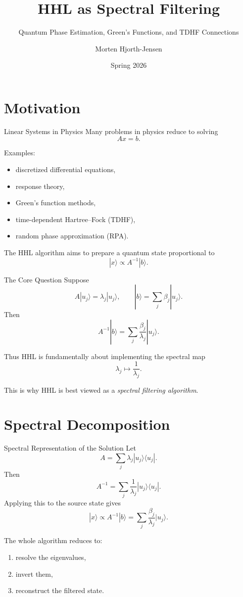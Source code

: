 \documentclass{beamer}
\title{HHL as Spectral Filtering}
\subtitle{Quantum Phase Estimation, Green's Functions, and TDHF Connections}
\author{Morten Hjorth-Jensen}
\date{Spring 2026}
\begin{document}
\frame{\titlepage}

\section{Motivation}

\begin{frame}{Linear Systems in Physics}
Many problems in physics reduce to solving
\[
A x = b.
\]

Examples:
\begin{itemize}
\item discretized differential equations,
\item response theory,
\item Green's function methods,
\item time-dependent Hartree--Fock (TDHF),
\item random phase approximation (RPA).
\end{itemize}

The HHL algorithm aims to prepare a quantum state proportional to
\[
|x\rangle \propto A^{-1}|b\rangle.
\]
\end{frame}


\begin{frame}{The Core Question}
Suppose
\[
A|u_j\rangle = \lambda_j |u_j\rangle,
\qquad
|b\rangle = \sum_j \beta_j |u_j\rangle.
\]
Then
\[
A^{-1}|b\rangle
=
\sum_j \frac{\beta_j}{\lambda_j}|u_j\rangle.
\]

Thus HHL is fundamentally about implementing the spectral map
\[
\lambda_j \mapsto \frac{1}{\lambda_j}.
\]

This is why HHL is best viewed as a \emph{spectral filtering algorithm}.
\end{frame}

\section{Spectral Decomposition}

\begin{frame}{Spectral Representation of the Solution}
Let
\[
A = \sum_j \lambda_j |u_j\rangle \langle u_j|.
\]
Then
\[
A^{-1} = \sum_j \frac{1}{\lambda_j} |u_j\rangle \langle u_j|.
\]
Applying this to the source state gives
\[
|x\rangle \propto A^{-1}|b\rangle
=
\sum_j \frac{\beta_j}{\lambda_j}|u_j\rangle.
\]

The whole algorithm reduces to:
\begin{enumerate}
\item resolve the eigenvalues,
\item invert them,
\item reconstruct the filtered state.
\end{enumerate}
\end{frame}
\end{document}

